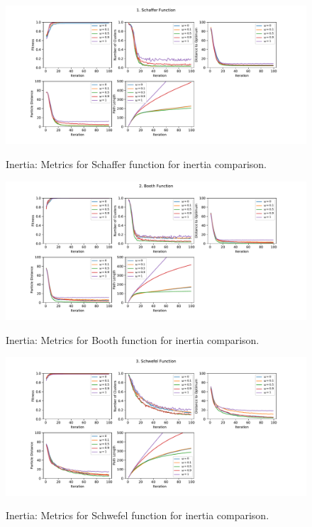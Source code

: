 \documentclass[12pt]{article}
\begin{document}
\begin{figure}[h!]
	\centering
	\includegraphics[width=1\textwidth]{figures/ex3/ex3-1.pdf}
	\label{fig:ex3-1}
	\caption{Inertia: Metrics for Schaffer function for inertia comparison.}
\end{figure}

\begin{figure}[h!]
	\centering
	\includegraphics[width=1\textwidth]{figures/ex3/ex3-2.pdf}
	\label{fig:ex3-2}
	\caption{Inertia: Metrics for Booth function for inertia comparison.}
\end{figure}

\begin{figure}[h!]
	\centering
	\includegraphics[width=1\textwidth]{figures/ex3/ex3-3.pdf}
	\label{fig:ex3-3}
	\caption{Inertia: Metrics for Schwefel function for inertia comparison.}
\end{figure}
\end{document}
